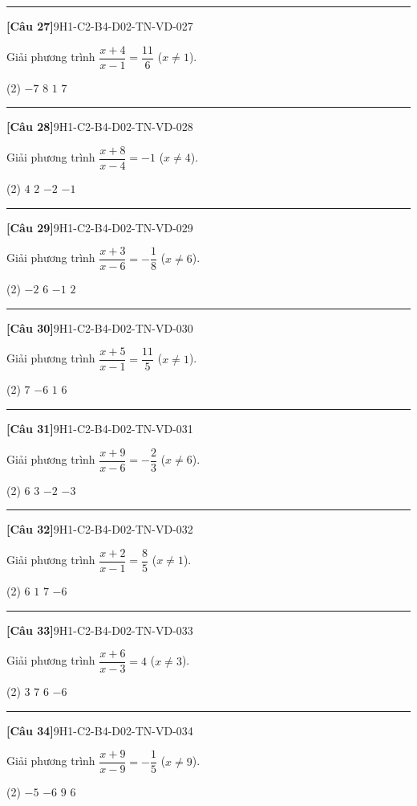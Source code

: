 \documentclass[12pt,a4paper]{article}
\newif\ifloigiai
\newenvironment{cauhoi}[2]{%
  \par\medskip\noindent\rule{\textwidth}{0.4pt}\par\nopagebreak
  \noindent\textbf{[#1]}\hfill{\scriptsize\ttfamily #2}\par\nopagebreak\smallskip}{\par}
\newcommand{\dapan}[1]{\ifloigiai\par\smallskip\noindent\textit{Đáp án:} \textbf{#1}\par\fi}
\begin{document}
\begin{cauhoi}{Câu 27}{9H1-C2-B4-D02-TN-VD-027}
Giải phương trình $\dfrac{x+4}{x-1}=\dfrac{11}{6}$ ($x\ne 1$).
\begin{tasks}(2)
\task $-7$
\task $8$
\task $1$
\task $7$
\end{tasks}
\dapan{D}
\end{cauhoi}
\begin{cauhoi}{Câu 28}{9H1-C2-B4-D02-TN-VD-028}
Giải phương trình $\dfrac{x+8}{x-4}=-1$ ($x\ne 4$).
\begin{tasks}(2)
\task $4$
\task $2$
\task $-2$
\task $-1$
\end{tasks}
\dapan{C}
\end{cauhoi}
\begin{cauhoi}{Câu 29}{9H1-C2-B4-D02-TN-VD-029}
Giải phương trình $\dfrac{x+3}{x-6}=-\dfrac{1}{8}$ ($x\ne 6$).
\begin{tasks}(2)
\task $-2$
\task $6$
\task $-1$
\task $2$
\end{tasks}
\dapan{A}
\end{cauhoi}
\begin{cauhoi}{Câu 30}{9H1-C2-B4-D02-TN-VD-030}
Giải phương trình $\dfrac{x+5}{x-1}=\dfrac{11}{5}$ ($x\ne 1$).
\begin{tasks}(2)
\task $7$
\task $-6$
\task $1$
\task $6$
\end{tasks}
\dapan{D}
\end{cauhoi}
\begin{cauhoi}{Câu 31}{9H1-C2-B4-D02-TN-VD-031}
Giải phương trình $\dfrac{x+9}{x-6}=-\dfrac{2}{3}$ ($x\ne 6$).
\begin{tasks}(2)
\task $6$
\task $3$
\task $-2$
\task $-3$
\end{tasks}
\dapan{D}
\end{cauhoi}
\begin{cauhoi}{Câu 32}{9H1-C2-B4-D02-TN-VD-032}
Giải phương trình $\dfrac{x+2}{x-1}=\dfrac{8}{5}$ ($x\ne 1$).
\begin{tasks}(2)
\task $6$
\task $1$
\task $7$
\task $-6$
\end{tasks}
\dapan{A}
\end{cauhoi}
\begin{cauhoi}{Câu 33}{9H1-C2-B4-D02-TN-VD-033}
Giải phương trình $\dfrac{x+6}{x-3}=4$ ($x\ne 3$).
\begin{tasks}(2)
\task $3$
\task $7$
\task $6$
\task $-6$
\end{tasks}
\dapan{C}
\end{cauhoi}
\begin{cauhoi}{Câu 34}{9H1-C2-B4-D02-TN-VD-034}
Giải phương trình $\dfrac{x+9}{x-9}=-\dfrac{1}{5}$ ($x\ne 9$).
\begin{tasks}(2)
\task $-5$
\task $-6$
\task $9$
\task $6$
\end{tasks}
\dapan{B}
\end{cauhoi}
\end{document}
